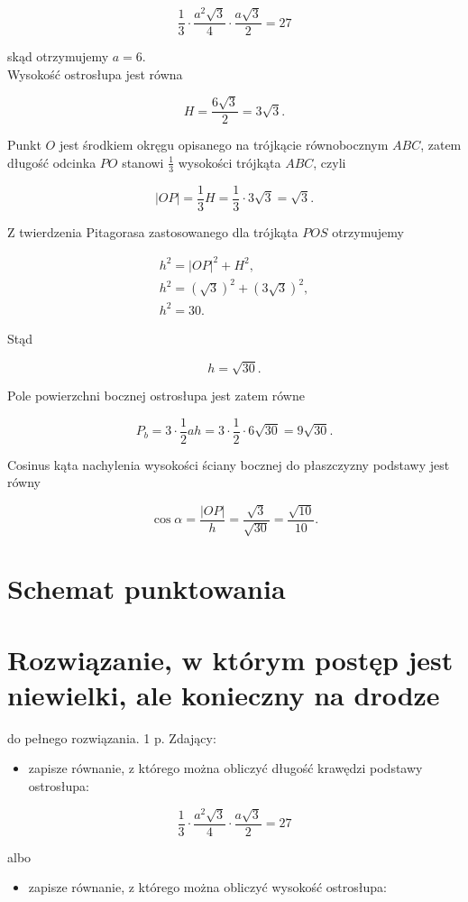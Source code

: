 \documentclass[10pt]{article}
\begin{document}
$$
\frac{1}{3} \cdot \frac{a^{2} \sqrt{3}}{4} \cdot \frac{a \sqrt{3}}{2}=27
$$

skąd otrzymujemy $a=6$.\\
Wysokość ostrosłupa jest równa

$$
H=\frac{6 \sqrt{3}}{2}=3 \sqrt{3} .
$$

Punkt $O$ jest środkiem okręgu opisanego na trójkącie równobocznym $A B C$, zatem długość odcinka $P O$ stanowi $\frac{1}{3}$ wysokości trójkąta $A B C$, czyli

$$
|O P|=\frac{1}{3} H=\frac{1}{3} \cdot 3 \sqrt{3}=\sqrt{3} .
$$

Z twierdzenia Pitagorasa zastosowanego dla trójkąta $P O S$ otrzymujemy

$$
\begin{gathered}
h^{2}=|O P|^{2}+H^{2}, \\
h^{2}=(\sqrt{3})^{2}+(3 \sqrt{3})^{2}, \\
h^{2}=30 .
\end{gathered}
$$

Stąd

$$
h=\sqrt{30} .
$$

Pole powierzchni bocznej ostrosłupa jest zatem równe

$$
P_{b}=3 \cdot \frac{1}{2} a h=3 \cdot \frac{1}{2} \cdot 6 \sqrt{30}=9 \sqrt{30} .
$$

Cosinus kąta nachylenia wysokości ściany bocznej do płaszczyzny podstawy jest równy

$$
\cos \alpha=\frac{|O P|}{h}=\frac{\sqrt{3}}{\sqrt{30}}=\frac{\sqrt{10}}{10} .
$$

\section*{Schemat punktowania}
\section*{Rozwiązanie, w którym postęp jest niewielki, ale konieczny na drodze}
 do pełnego rozwiązania. 1 p. Zdający:\begin{itemize}
  \item zapisze równanie, z którego można obliczyć długość krawędzi podstawy ostrosłupa:
\end{itemize}

$$
\frac{1}{3} \cdot \frac{a^{2} \sqrt{3}}{4} \cdot \frac{a \sqrt{3}}{2}=27
$$

albo

\begin{itemize}
  \item zapisze równanie, z którego można obliczyć wysokość ostrosłupa:
\end{itemize}
\end{document}
